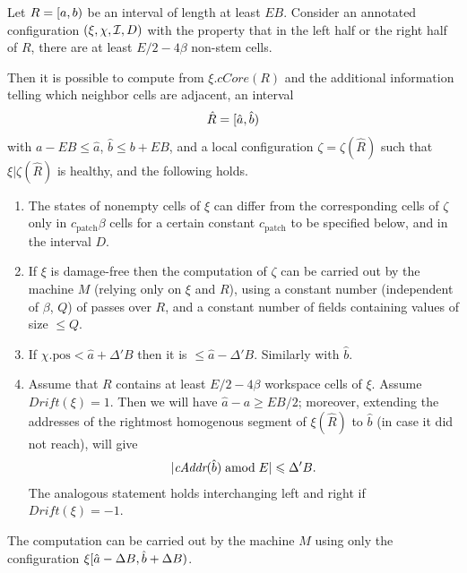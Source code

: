 \documentclass[12pt]{memoir}
\newcommand{\fld}[1]{\ensuremath{\textit{#1}}}
\def\B{B}
\newcommand{\D}{D}
\newcommand{\E}{E}
\newcommand{\pos}{\mathrm{pos}}
\newcommand{\R}{R}
\newcommand{\cAddr}{\fld{cAddr}}
\newcommand{\cCore}{\fld{cCore}}
\newcommand{\Drift}{\fld{Drift}}
\newcommand{\patch}{\mathrm{patch}}
\begin{document}
\begin{lemma}[Patching]\label{lem:patching}
    Let  \( \R=\lint{a}{b} \) be an interval of length at least \( \E\B \).
    Consider an
annotated configuration \(  (\xi, \chi, \cI, \D) \)  with the property that in the left half 
or the right half of \( \R \), there are at least \( \E/2-4\beta \) non-stem cells.

   Then it is possible to compute from \( \xi.\cCore(\R) \) and the additional information telling
which neighbor cells are adjacent,  an interval
\begin{align*}
   \hat \R =\lint{\hat a}{\hat b}
 \end{align*}
with \( a-\E\B\le\hat a \), \( \hat b \le b+\E\B \),
and a local configuration \( \zeta = \zeta(\hat \R) \)
such that \( \xi |\zeta(\hat \R) \) is healthy, and the following holds.

    \begin{enumerate}[\upshape (a)]
     \item
        The states of nonempty cells of \( \xi \) can differ from the corresponding cells
        of \( \zeta \) only in \( c_{\patch}\beta \) cells for a certain constant
        \( c_{\patch} \)  to be specified below, and in the interval \( \D \).

     \item
        If \( \xi \) is damage-free then the 
        computation of \( \zeta \) can be carried out by the machine \( M \)
        (relying only on \( \xi \) and \( \R \)), using a
        constant number (independent of \( \beta \), \( Q \))
        of passes over \( \R \), and a constant number
        of fields containing values of size \( \le Q \).

   \item\label{i:patching.inside}
       If \( \chi.\pos < \hat a +\Delta'\B \) then it is \( \le \hat a - \Delta'\B \).
       Similarly with \( \hat b \).

       \item\label{i:patching.align}
         Assume that \( \R \) contains at least \( E/2-4\beta \) workspace cells of \( \xi \).
       Assume \( \Drift(\xi)=1 \).
       Then we will have \( \hat a-a\ge\E\B/2 \); moreover, extending the addresses of the 
       rightmost homogenous segment of \( \xi(\hat\R) \) to \( \hat b \) 
       (in case it did not reach), will give
 \begin{align*}
   |\cAddr(\hat b) \amod \E|\le \Delta'\B.
 \end{align*}
 The analogous statement holds interchanging left and right if \( \Drift(\xi)=-1 \).
      \end{enumerate}
The computation can be carried out by the machine \( M \) using only the configuration
\( \xi\lint{\hat a-\Delta\B}{\hat b+\Delta\B} \).
\end{lemma}
\end{document}
